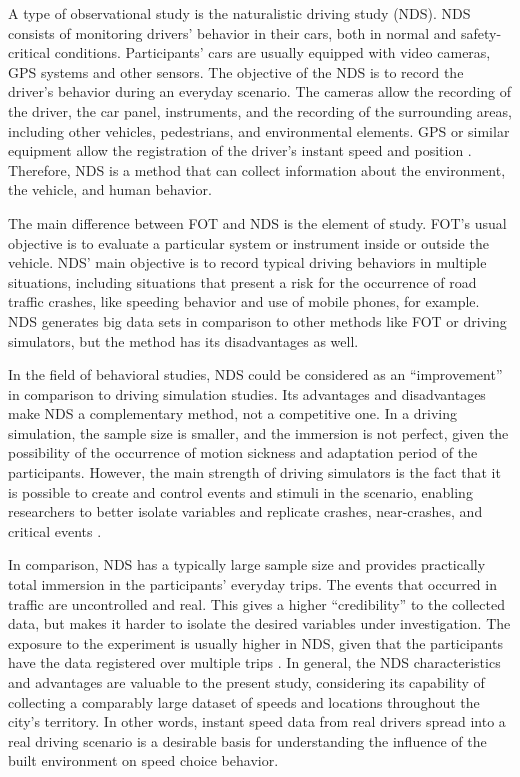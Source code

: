 A type of observational study is the naturalistic driving study (NDS). NDS consists of monitoring drivers' behavior in their cars, both in normal and safety-critical conditions. Participants' cars are usually equipped with video cameras, GPS systems and other sensors. The objective of the NDS is to record the driver's behavior during an everyday scenario. The cameras allow the recording of the driver, the car panel, instruments, and the recording of the surrounding areas, including other vehicles, pedestrians, and environmental elements. GPS or similar equipment allow the registration of the driver's instant speed and position \cite{Shinar2017}. Therefore, NDS is a method that can collect information about the environment, the vehicle, and human behavior.

The main difference between FOT and NDS is the element of study. FOT's usual objective is to evaluate a particular system or instrument inside or outside the vehicle. NDS' main objective is to record typical driving behaviors in multiple situations, including situations that present a risk for the occurrence of road traffic crashes, like speeding behavior and use of mobile phones, for example. NDS generates big data sets in comparison to other methods like FOT or driving simulators, but the method has its disadvantages as well. 

In the field of behavioral studies, NDS could be considered as an ``improvement'' in comparison to driving simulation studies. Its advantages and disadvantages make NDS a complementary method, not a competitive one. In a driving simulation, the sample size is smaller, and the immersion is not perfect, given the possibility of the occurrence of motion sickness and adaptation period of the participants. However, the main strength of driving simulators is the fact that it is possible to create and control events and stimuli in the scenario, enabling researchers to better isolate variables and replicate crashes, near-crashes, and critical events \cite{Shinar2017}.   

In comparison, NDS has a typically large sample size and provides practically total immersion in the participants' everyday trips. The events that occurred in traffic are uncontrolled and real. This gives a higher ``credibility'' to the collected data, but makes it harder to isolate the desired variables under investigation. The exposure to the experiment is usually higher in NDS, given that the participants have the data registered over multiple trips \cite{Carsten2013}. In general, the NDS characteristics and advantages are valuable to the present study, considering its capability of collecting a comparably large dataset of speeds and locations throughout the city's territory. In other words, instant speed data from real drivers spread into a real driving scenario is a desirable basis for understanding the influence of the built environment on speed choice behavior.


